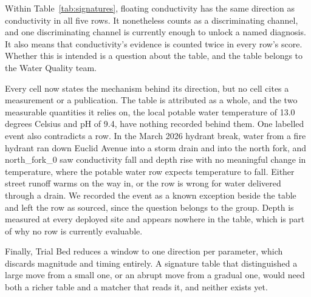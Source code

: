 \documentclass{article}
\begin{document}
Within Table~\ref{tab:signatures}, floating conductivity has the same direction
as conductivity in all five rows. It nonetheless counts as a discriminating
channel, and one discriminating channel is currently enough to unlock a named
diagnosis. It also means that conductivity's evidence is counted twice in every
row's score. Whether this is intended is a question about the table, and the
table belongs to the Water Quality team.

Every cell now states the mechanism behind its direction, but no cell cites
a measurement or a publication. The table is attributed as a whole, and the
two measurable quantities it relies on, the local potable water temperature
of 13.0 degrees Celsius and pH of 9.4, have nothing recorded behind them.
One labelled event also contradicts a row. In the March 2026 hydrant break,
water from a fire hydrant ran down Euclid Avenue into a storm drain and into
the north fork, and north\_fork\_0 saw conductivity fall and depth rise with
no meaningful change in temperature, where the potable water row expects
temperature to fall. Either street runoff warms on the way in, or the row is
wrong for water delivered through a drain. We recorded the event as a known
exception beside the table and left the row as sourced, since the question
belongs to the group. Depth is measured
at every deployed site and appears nowhere in the table, which is part of why
no row is currently evaluable.

Finally, Trial Bed reduces a window to one direction per parameter, which
discards magnitude and timing entirely. A signature table that distinguished a
large move from a small one, or an abrupt move from a gradual one, would need
both a richer table and a matcher that reads it, and neither exists yet.



\end{document}
